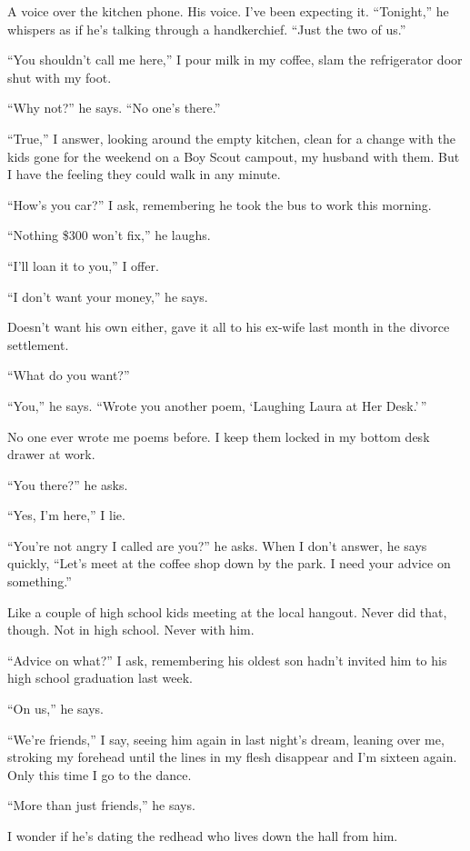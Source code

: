 \documentclass[
]{article}
\begin{document}
A voice over the kitchen phone. His voice. I've been expecting it.
``Tonight,'' he whispers as if he's talking through a handkerchief.
``Just the two of us.''

``You shouldn't call me here,'' I pour milk in my coffee, slam the
refrigerator door shut with my foot.

``Why not?'' he says. ``No one's there.''

``True,'' I answer, looking around the empty kitchen, clean for a change
with the kids gone for the weekend on a Boy Scout campout, my husband
with them. But I have the feeling they could walk in any minute.

``How's you car?'' I ask, remembering he took the bus to work this
morning.

``Nothing \$300 won't fix,'' he laughs.

``I'll loan it to you,'' I offer.

``I don't want your money,'' he says.

Doesn't want his own either, gave it all to his ex-wife last month in
the divorce settlement.

``What do you want?''

``You,'' he says. ``Wrote you another poem, `Laughing Laura at Her
Desk.'\,''

No one ever wrote me poems before. I keep them locked in my bottom desk
drawer at work.

``You there?'' he asks.

``Yes, I'm here,'' I lie.

``You're not angry I called are you?'' he asks. When I don't answer, he
says quickly, ``Let's meet at the coffee shop down by the park. I need
your advice on something.''

Like a couple of high school kids meeting at the local hangout. Never
did that, though. Not in high school. Never with him.

``Advice on what?'' I ask, remembering his oldest son hadn't invited him
to his high school graduation last week.

``On us,'' he says.

``We're friends,'' I say, seeing him again in last night's dream,
leaning over me, stroking my forehead until the lines in my flesh
disappear and I'm sixteen again. Only this time I go to the dance.

``More than just friends,'' he says.

I wonder if he's dating the redhead who lives down the hall from him.
\end{document}
